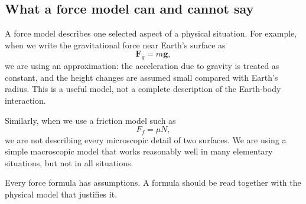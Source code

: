 \subsection{What a force model can and cannot say}

A force model describes one selected aspect of a physical situation. For example, when we write the gravitational force near Earth's surface as
\[
\mathbf{F}_g=m\mathbf{g},
\]
we are using an approximation: the acceleration due to gravity is treated as constant, and the height changes are assumed small compared with Earth's radius. This is a useful model, not a complete description of the Earth-body interaction.

Similarly, when we use a friction model such as
\[
F_f=\mu N,
\]
we are not describing every microscopic detail of two surfaces. We are using a simple macroscopic model that works reasonably well in many elementary situations, but not in all situations.

\begin{remarkbox}
Every force formula has assumptions. A formula should be read together with the physical model that justifies it.
\end{remarkbox}
